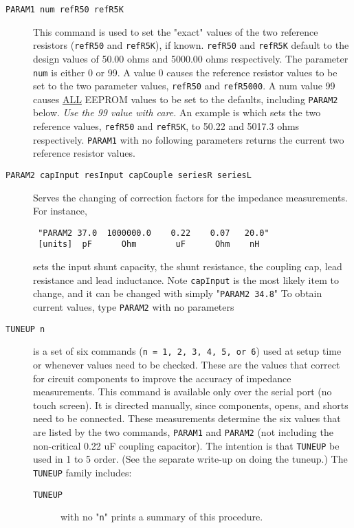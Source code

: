 \begin{description}

\item[\texttt{PARAM1 num refR50 refR5K}]
This command is used to set the "exact" values of the two reference resistors (\texttt{refR50} and \texttt{refR5K}), if known.  \texttt{refR50} and \texttt{refR5K} default to the design values of 50.00 ohms and 5000.00 ohms respectively. The parameter \texttt{num} is either 0 or 99. A value 0 causes the reference resistor values to be set to the two parameter values, \texttt{refR50} and \texttt{refR5000}.  A num value 99 causes \underline{ALL} EEPROM values to be set to the defaults, including \texttt{PARAM2} below. \textit{Use the 99 value with care.}  An example is  which sets the two reference values, \texttt{refR50} and \texttt{refR5K}, to 50.22 and 5017.3 ohms respectively.  \texttt{PARAM1} with no following parameters returns the current two reference resistor values.

\item[\texttt{PARAM2 capInput resInput capCouple seriesR seriesL}]
Serves the changing of correction factors for the impedance measurements.
 For instance,
 \begin{verbatim}
 "PARAM2 37.0  1000000.0    0.22    0.07   20.0"
 [units]  pF      Ohm        uF      Ohm    nH
 \end{verbatim}
 sets the input shunt capacity, the shunt resistance, the coupling cap, lead resistance and lead inductance.
Note \texttt{capInput} is the most likely item to change, and it can be changed with simply "\texttt{PARAM2 34.8}"
To obtain current values, type  \texttt{PARAM2}  with no parameters

\item[\texttt{TUNEUP n}] is a set of six commands (\texttt{n = 1, 2, 3, 4, 5, or 6}) used at setup time or whenever values need to be checked. These are the values that correct for circuit  components to improve the accuracy of impedance measurements. This command is available only over the serial port (no touch screen). It is directed manually, since components, opens, and shorts need to be connected.  These measurements determine the six values that are listed by the two commands, \texttt{PARAM1} and \texttt{PARAM2} (not including the non-critical 0.22 uF coupling capacitor).  The intention is that \texttt{TUNEUP} be used in 1 to 5 order. (See the separate write-up on doing the tuneup.) The \texttt{TUNEUP} family includes:
\begin{description}
\item[\texttt{TUNEUP}] with no "\texttt{n}" prints a summary of this procedure.


\end{description}
\end{description}
